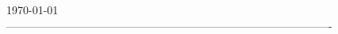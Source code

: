 \documentclass[12pt]{article}
\begin{document}
\begin{titlepage}


{\large \today}\\[3cm] %


 
----------------------------------------------------------------------------------------

\vfill %

\end{titlepage}
\thispagestyle{empty}
\newpage
\setcounter{tocdepth}{3}
\tableofcontents
\thispagestyle{empty}
\pagestyle{main}
\setcounter{page}{1} 



\end{document}
